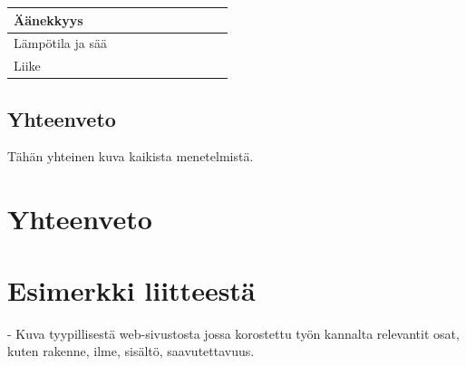 \documentclass[finnish, 12pt, a4paper, elec, utf8, a-1b, online]{aaltothesis}
\begin{document}
{\begin{longtable}{p{2.5cm}|p{6cm}|p{0.5cm}p{0.5cm}p{0.5cm}|p{0.5cm}|p{0.5cm}p{0.5cm}p{0.5cm}|p{0.5cm}|}
        \midrule
        Äänekkyys                                                                                                                                                                                                                                                                                                                                                                                                                   \\
        \midrule
        Lämpötila ja sää                                                                                                                                                                                                                                                                                                                                                                                                            \\
        \midrule
        Liike                                                                                                                                                                                                                                                                                                                                                                                                                       \\
    \end{longtable}
}

\subsection{Yhteenveto}

Tähän yhteinen kuva kaikista menetelmistä.

\clearpage

\section{Yhteenveto}

\clearpage

\thesisbibliography{}
\printbibliography{}

\clearpage
\thesisappendix{}

\section{Esimerkki liitteestä\label{LiiteA}}

- Kuva tyypillisestä web-sivustosta jossa korostettu työn kannalta relevantit
osat, kuten rakenne, ilme, sisältö, saavutettavuus.
\end{document}

